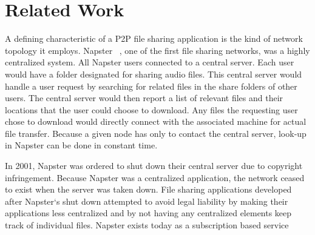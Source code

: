 \documentclass{acm_proc_article-sp}
\begin{document}
\section{Related Work}
A defining characteristic of a P2P file sharing application is the kind of network topology it employs.  Napster ~\cite{nap}, one of the first file sharing networks, was a highly centralized system.  All Napster users connected to a central server.  Each user would have a folder designated for sharing audio files.  This central server would handle a user request by searching for related files in the share folders of other users.  The central server would then report a list of relevant files and their locations that the user could choose to download.  Any files the requesting user chose to download would directly connect with the associated machine for actual file transfer. Because a given node has only to contact the central server, look-up in Napster can be done in constant time. ~\cite{superpeer}


In 2001, Napster was ordered to shut down their central server due to copyright infringement.  Because Napster was a centralized application, the network ceased to exist when the server was taken down. File sharing applications developed after Napster`s shut down attempted to avoid legal liability by making their applications less centralized and by not having any centralized elements keep track of individual files.  Napster exists today as a subscription based service ~\cite{napster}
\end{document}
